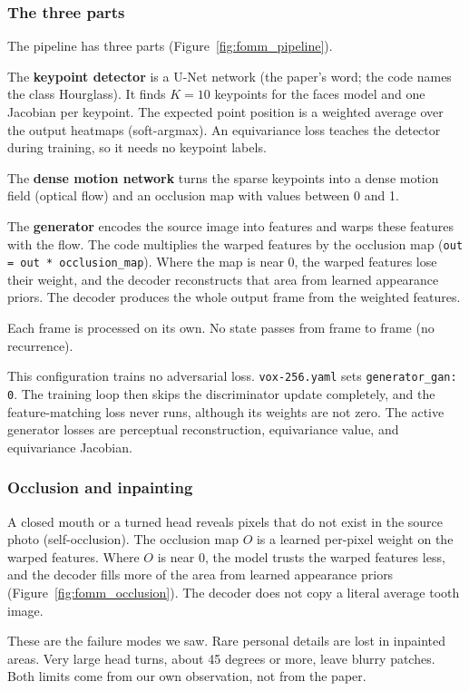 \subsubsection{The three parts}
The pipeline has three parts (Figure~\ref{fig:fomm_pipeline}).



The \textbf{keypoint detector} is a U-Net network (the paper's word; the code
names the class Hourglass). It finds $K=10$ keypoints for the faces model and
one Jacobian per keypoint. The expected point position is a weighted average
over the output heatmaps (soft-argmax). An equivariance loss teaches the
detector during training, so it needs no keypoint labels.

The \textbf{dense motion network} turns the sparse keypoints into a dense motion
field (optical flow) and an occlusion map with values between 0 and 1.

The \textbf{generator} encodes the source image into features and warps these
features with the flow. The code multiplies the warped features by the occlusion
map (\texttt{out = out * occlusion\_map}). Where the map is near 0, the warped
features lose their weight, and the decoder reconstructs that area from learned
appearance priors. The decoder produces the whole output frame from the weighted
features.

Each frame is processed on its own. No state passes from frame to frame (no
recurrence).

This configuration trains no adversarial loss. \texttt{vox-256.yaml} sets
\texttt{generator\_gan: 0}. The training loop then skips the discriminator
update completely, and the feature-matching loss never runs, although its
weights are not zero. The active generator losses are perceptual
reconstruction, equivariance value, and equivariance Jacobian.

\subsubsection{Occlusion and inpainting}
A closed mouth or a turned head reveals pixels that do not exist in the source
photo (self-occlusion). The occlusion map $O$ is a learned per-pixel weight on
the warped features. Where $O$ is near 0, the model trusts the warped features
less, and the decoder fills more of the area from learned appearance priors
(Figure~\ref{fig:fomm_occlusion}). The decoder does not copy a literal average
tooth image.

These are the failure modes we saw. Rare personal details are lost in inpainted
areas. Very large head turns, about 45 degrees or more, leave blurry patches.
Both limits come from our own observation, not from the paper.

